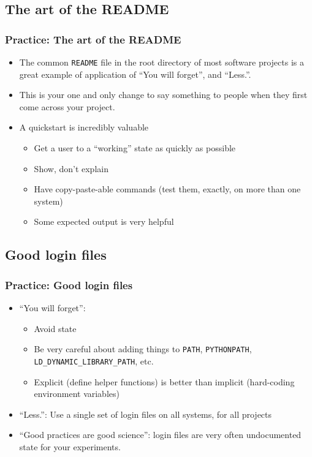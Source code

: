 \documentclass{beamer}
\begin{document}
\subsection{The art of the README}
\begin{frame}[fragile]
\frametitle{Practice: The art of the README}
  \begin{itemize}
    \item The common \texttt{README} file in the root directory of most software projects is a great example of application of ``You will forget'', and ``Less.''.
    \item This is your one and only change to say something to people when they first come across your project.
    \item A quickstart is incredibly valuable
      \begin{itemize}
        \item Get a user to a ``working'' state as quickly as possible
        \item Show, don't explain
        \item Have copy-paste-able commands (test them, exactly, on more than one system)
        \item Some expected output is very helpful
      \end{itemize}
    \end{itemize}
\end{frame}

\subsection{Good login files}
\begin{frame}[fragile]
\frametitle{Practice: Good login files}
\begin{itemize}
  \item ``You will forget'': 
    \begin{itemize}
      \item Avoid state
  \item Be very careful about adding things to \lstinline{PATH}, \lstinline{PYTHONPATH}, \lstinline{LD_DYNAMIC_LIBRARY_PATH}, etc.
  \item Explicit (define helper functions) is better than implicit (hard-coding environment variables)
    \end{itemize}
  \item ``Less.'': Use a single set of login files on all systems, for all projects
  \item ``Good practices are good science'': login files are very often undocumented state for your experiments.
\end{itemize}
\end{frame}
\end{document}

